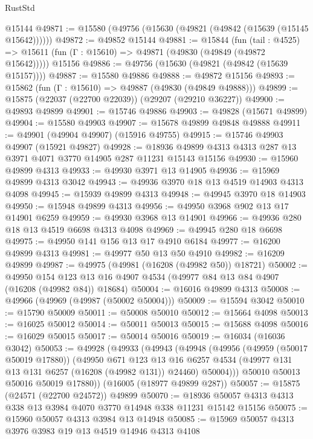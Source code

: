 \begin{lexlean}{RustStd}
\begin{coremodule}
    @15144
@49871 := @15580 (@49756 (@15630 (@49821 (@49842 (@15639 (@15145 @15642))))))
@49872 := @49852 @15144
@49881 := @15844
    (fun (tail : @4525) => @15611 (fun (Γ : @15610) => @49871 (@49830 (@49849 (@49872 @15642)))))
    @15156
@49886 := @49756 (@15630 (@49821 (@49842 (@15639 @15157))))
@49887 := @15580 @49886
@49888 := @49872 @15156
@49893 := @15862 (fun (Γ : @15610) => @49887 (@49830 (@49849 @49888)))
@49899 := @15875 (@22037 (@22700 @22039)) (@29207 (@29210 @36227))
@49900 := @49893 @49899
@49901 := @15746 @49886
@49903 := @49828 (@15671 @49899)
@49904 := @15580 @49903
@49907 := @15678 @49899 @49848 @49888
@49911 := @49901 (@49904 @49907) (@15916 @49755)
@49915 := @15746 @49903 @49907 (@15921 @49827)
@49928 := @18936 @49899 @4313 @4313 @287 @13 @3971 @4071 @3770 @14905 @287 @11231 @15143 @15156
@49930 := @15960 @49899 @4313
@49933 := @49930 @3971 @13 @14905
@49936 := @15969 @49899 @4313 @3042
@49943 := @49936 @3970 @18 @13 @4519 @14903 @4313 @4098
@49945 := @15939 @49899 @4313
@49948 := @49945 @3970 @18 @14903
@49950 := @15948 @49899 @4313
@49956 := @49950 @3968 @902 @13 @17 @14901 @6259
@49959 := @49930 @3968 @13 @14901
@49966 := @49936 @280 @18 @13 @4519 @6698 @4313 @4098
@49969 := @49945 @280 @18 @6698
@49975 := @49950 @141 @156 @13 @17 @4910 @6184
@49977 := @16200 @49899 @4313
@49981 := @49977 @50 @13 @50 @4910
@49982 := @16209 @49899
@49987 := @49975 (@49981 (@16208 (@49982 @50)) @18721)
@50002 := @49950
    @154
    @123
    @13
    @16
    @4907
    @4534
    (@49977 @84 @13 @84 @4907 (@16208 (@49982 @84)) @18684)
@50004 := @16016 @49899 @4313
@50008 := @49966 (@49969 (@49987 (@50002 @50004)))
@50009 := @15594 @3042
@50010 := @15790 @50009
@50011 := @50008 @50010
@50012 := @15664 @4098
@50013 := @16025 @50012
@50014 := @50011 @50013
@50015 := @15688 @4098
@50016 := @16029 @50015
@50017 := @50014 @50016
@50019 := @16034 (@16036 @3042)
@50053 := @49928
    (@49933
      (@49943
        (@49948
          (@49956
            (@49959 (@50017 @50019 @17880))
            (@49950
              @671
              @123
              @13
              @16
              @6257
              @4534
              (@49977 @131 @13 @131 @6257 (@16208 (@49982 @131)) @24460)
              @50004)))
        @50010
        @50013
        @50016
        @50019
        @17880))
    (@16005 (@18977 @49899 @287))
@50057 := @15875 (@24571 (@22700 @24572)) @49899
@50070 := @18936 @50057 @4313 @4313 @338 @13 @3984 @4070 @3770 @14948 @338 @11231 @15142 @15156
@50075 := @15960 @50057 @4313 @3984 @13 @14948
@50085 := @15969 @50057 @4313 @3976 @3983 @19 @13 @4519 @14946 @4313 @4108

\end{coremodule}
\end{lexlean}
